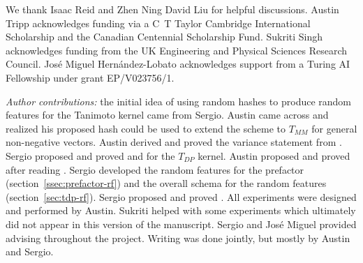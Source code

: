 \documentclass{article}
\begin{document}
\maketitle

\begin{abstract}

\end{abstract}
















\newpage


\begin{ack}
We thank Isaac Reid and  Zhen Ning David Liu for helpful discussions.
Austin Tripp acknowledges funding via a C~T Taylor Cambridge International Scholarship and the  Canadian Centennial Scholarship Fund.
Sukriti Singh acknowledges funding from the UK Engineering and Physical Sciences Research Council.
José Miguel Hernández-Lobato acknowledges support from a Turing AI Fellowship under grant EP/V023756/1.

\emph{Author contributions:} the initial idea of using random hashes to produce random features for the Tanimoto kernel
came from Sergio.
Austin came across \citet{ioffe2010improved} and realized his proposed hash could be used to extend the scheme to $T_{MM}$
for general non-negative vectors.
Austin derived and proved the variance statement from .
Sergio proposed and proved  and  for the $T_{DP}$ kernel.
Austin proposed and proved  after reading \citet{charikar2002similarity}.
Sergio developed the random features for the prefactor (section~\ref{ssec:prefactor-rf})
and the overall schema for the random features (section~\ref{sec:tdp-rf}).
Sergio proposed and proved .
All experiments were designed and performed by Austin.
Sukriti helped with some experiments which ultimately did not appear in this version of the manuscript.
Sergio and Jos{\'e} Miguel provided advising throughout the project.
Writing was done jointly, but mostly by Austin and Sergio.
\end{ack}
\end{document}

